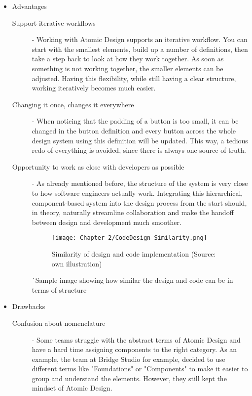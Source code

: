 \begin{itemize}
	\item Advantages
	      \begin{description}
		      \item[Support iterative workflows] - Working with Atomic Design supports an iterative
		            workflow. You can start with the smallest elements, build up a number of
		            definitions, then take a step back to look at how they work together. As soon as
		            something is not working together, the smaller elements can be adjusted. Having
		            this flexibility, while still having a clear structure, working iteratively
		            becomes much easier. 
		      \item[Changing it once, changes it everywhere] - When noticing that the padding
		            of a button is too small, it can be changed in the button definition and every
		            button across the whole design system using this definition will be updated.
		            This way, a tedious redo of everything is avoided, since there is always one
		            source of truth.
		      \item[Opportunity to work as close with developers as possible] - As already mentioned
		            before, the structure of the system is very close to how software engineers
		            actually work. Integrating this hierarchical, component-based system into the
		            design process from the start should, in theory, naturally streamline
		            collaboration and make the handoff between design and development much smoother.

		            \begin{figure}[h!]
			            \begin{center}
				            \texttt{[image: Chapter 2/CodeDesign Similarity.png]}
				            \caption{Similarity of design and code implementation (Source: own illustration)}
			            \end{center}
		            \end{figure}
		            ^^ Sample image showing how similar the design and code can be in terms of structure
	      \end{description}
	\item Drawbacks
	      \begin{description}
		      \item[Confusion about nomenclature] - Some teams struggle with the abstract terms of
		            Atomic Design and have a hard time assigning components to the right category.
		            As an example, the team at Bridge Studio for example, decided to use different
		            terms like "Foundations" or "Components" to make it easier to group and
		            understand the elements. However, they still kept the mindset of Atomic Design.


\end{description}
\end{itemize}
